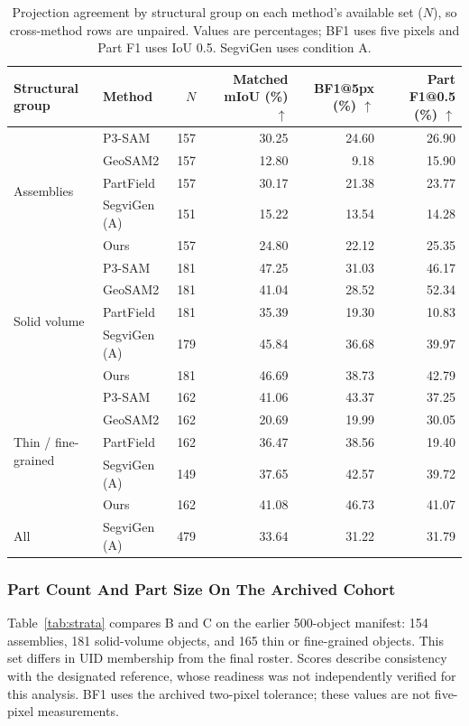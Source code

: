 \documentclass[pdflatex,iicol,sn-apa]{sn-jnl}
\begin{document}
\begin{table}[t]
\caption{Projection agreement by structural group on each method's available set ($N$), so cross-method rows are unpaired. Values are percentages; BF1 uses five pixels and Part F1 uses IoU 0.5. SegviGen uses condition A.}
\label{tab:projection_group}
\centering\small
\begin{tabular}{@{}llrrrr@{}}
\toprule
Structural group & Method & $N$ & Matched mIoU (\%) $\uparrow$ & BF1@5px (\%) $\uparrow$ & Part F1@0.5 (\%) $\uparrow$\\
\midrule
\multirow{5}{*}{Assemblies} & P3-SAM & 157 & 30.25 & 24.60 & 26.90\\
 & GeoSAM2 & 157 & 12.80 & 9.18 & 15.90\\
 & PartField & 157 & 30.17 & 21.38 & 23.77\\
 & SegviGen (A) & 151 & 15.22 & 13.54 & 14.28\\
 & Ours & 157 & 24.80 & 22.12 & 25.35\\
\midrule
\multirow{5}{*}{Solid volume} & P3-SAM & 181 & 47.25 & 31.03 & 46.17\\
 & GeoSAM2 & 181 & 41.04 & 28.52 & 52.34\\
 & PartField & 181 & 35.39 & 19.30 & 10.83\\
 & SegviGen (A) & 179 & 45.84 & 36.68 & 39.97\\
 & Ours & 181 & 46.69 & 38.73 & 42.79\\
\midrule
\multirow{5}{*}{Thin / fine-grained} & P3-SAM & 162 & 41.06 & 43.37 & 37.25\\
 & GeoSAM2 & 162 & 20.69 & 19.99 & 30.05\\
 & PartField & 162 & 36.47 & 38.56 & 19.40\\
 & SegviGen (A) & 149 & 37.65 & 42.57 & 39.72\\
 & Ours & 162 & 41.08 & 46.73 & 41.07\\
\midrule
All & SegviGen (A) & 479 & 33.64 & 31.22 & 31.79\\
\bottomrule
\end{tabular}
\end{table}

\subsubsection{Part Count And Part Size On The Archived Cohort}
\label{sec:part_size}

Table~\ref{tab:strata} compares B and C on the earlier 500-object manifest: 154 assemblies, 181 solid-volume objects, and 165 thin or fine-grained objects. This set differs in UID membership from the final roster. Scores describe consistency with the designated reference, whose readiness was not independently verified for this analysis. BF1 uses the archived two-pixel tolerance; these values are not five-pixel measurements.
\end{document}
